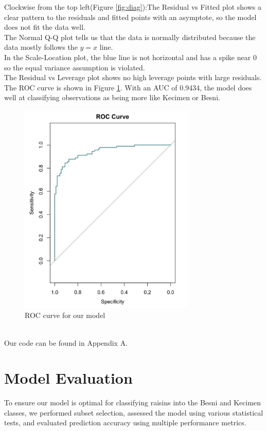 \documentclass{article}
\begin{document}
\clearpage
Clockwise from the top left(Figure \ref{fig:diag}):The Residual vs Fitted plot shows a clear pattern to the residuals and fitted points with an asymptote, so the model does not fit the data well.\\
The Normal Q-Q plot tells us that the data is normally distributed because the data mostly follows the $y=x$ line.\\
In the Scale-Location plot, the blue line is not horizontal and has a spike near 0 so the equal variance assumption is violated.\\
The Residual vs Leverage plot shows no high leverage points with large residuals. \\
The ROC curve is shown in Figure \ref{fig:roc}. With an AUC of 0.9434, the model does well at classifying observations as being more like Kecimen or Besni.
\begin{figure}[ht]
	\centering
	\includegraphics[width=0.75\textwidth]{roc_curve}
\caption{ROC curve for our model}
\label{fig:roc}
\end{figure} \\
Our code can be found in Appendix A.
\clearpage



\section{Model Evaluation}

To ensure our model is optimal for classifying raisins into the Besni and Kecimen classes, we performed subset selection, assessed the model using various statistical tests, and evaluated prediction accuracy using multiple performance metrics.
\end{document}
